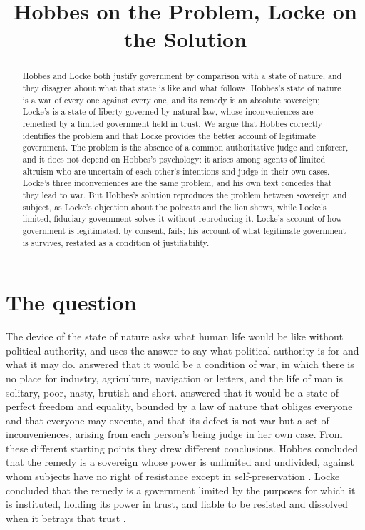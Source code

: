 \documentclass{situationist-preprint}
\title{Hobbes on the Problem, Locke on the Solution}
\begin{document}
\maketitle

\begin{abstract}
Hobbes and Locke both justify government by comparison with a state of nature, and they disagree about what that state is like and what follows. Hobbes's state of nature is a war of every one against every one, and its remedy is an absolute sovereign; Locke's is a state of liberty governed by natural law, whose inconveniences are remedied by a limited government held in trust. We argue that Hobbes correctly identifies the problem and that Locke provides the better account of legitimate government. The problem is the absence of a common authoritative judge and enforcer, and it does not depend on Hobbes's psychology: it arises among agents of limited altruism who are uncertain of each other's intentions and judge in their own cases. Locke's three inconveniences are the same problem, and his own text concedes that they lead to war. But Hobbes's solution reproduces the problem between sovereign and subject, as Locke's objection about the polecats and the lion shows, while Locke's limited, fiduciary government solves it without reproducing it. Locke's account of how government is legitimated, by consent, fails; his account of what legitimate government is survives, restated as a condition of justifiability.
\end{abstract}

\section{The question}

The device of the state of nature asks what human life would be like without political authority, and uses the answer to say what political authority is for and what it may do. \citet[ch.~13]{Hobbes1651} answered that it would be a condition of war, in which there is no place for industry, agriculture, navigation or letters, and the life of man is solitary, poor, nasty, brutish and short. \citet[\S\S 4--15]{Locke1689} answered that it would be a state of perfect freedom and equality, bounded by a law of nature that obliges everyone and that everyone may execute, and that its defect is not war but a set of inconveniences, arising from each person's being judge in her own case. From these different starting points they drew different conclusions. Hobbes concluded that the remedy is a sovereign whose power is unlimited and undivided, against whom subjects have no right of resistance except in self-preservation \citep[chs.~18, 21]{Hobbes1651}. Locke concluded that the remedy is a government limited by the purposes for which it is instituted, holding its power in trust, and liable to be resisted and dissolved when it betrays that trust \citep[\S\S 149, 221--222]{Locke1689}.
\end{document}
